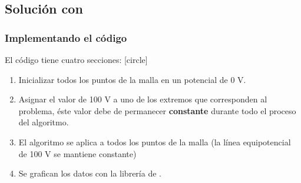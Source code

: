 \subsection{Solución con \python}
\begin{frame}
\frametitle{Implementando el código}
El código tiene cuatro secciones:
[circle]
\begin{enumerate}[<+->]
\item Inicializar todos los puntos de la malla en un potencial de 0 V.
\item Asignar el valor de 100 V a uno de los extremos que corresponden al problema, éste valor debe de permanecer \textbf{constante} durante todo el proceso del algoritmo.
\item El algoritmo se aplica a todos los puntos de la malla (la línea equipotencial de 100 V se mantiene constante)
\item Se grafican los datos con la librería de .
\end{enumerate}
\end{frame}

